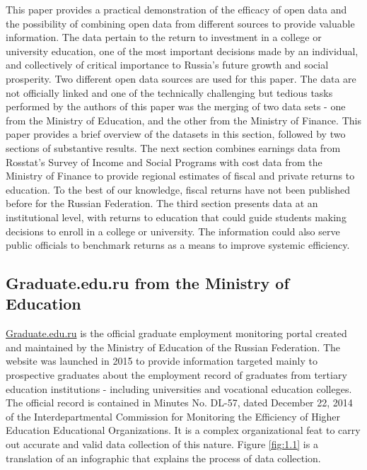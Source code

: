 \documentclass[alpha-refs]{wiley-article-05g}
\begin{document}
This paper provides a practical demonstration of the efficacy of open data 
and the possibility of combining open data from different sources to 
provide valuable information. The data pertain to the return to investment 
in a college or university education, one of the most important decisions 
made by an individual, and collectively of critical importance to Russia's 
future growth and social prosperity. Two different open data sources are 
used for this paper. The data are not officially linked and one of the 
technically challenging but tedious tasks performed by the authors of this 
paper was the merging of two data sets - one from the Ministry of 
Education, and the other from the Ministry of Finance. This paper provides 
a brief overview of the datasets in this section, followed by two sections 
of substantive results. The next section combines earnings data from 
Rosstat's Survey of Income and Social Programs with cost data from the 
Ministry of Finance to provide regional estimates of fiscal and private 
returns to education. To the best of our knowledge, fiscal returns have not 
been published before for the Russian Federation. The third section 
presents data at an institutional level, with returns to education that 
could guide students making decisions to enroll in a college or university. 
The information could also serve public officials to benchmark returns as a 
means to improve systemic efficiency. 

\subsection{Graduate.edu.ru from the Ministry of Education}

\url{Graduate.edu.ru} is the official graduate employment monitoring portal 
created and maintained by the Ministry of Education of the Russian 
Federation. The website was launched in 2015 to provide information 
targeted mainly to prospective graduates about the employment record of 
graduates from tertiary education institutions - including universities and 
vocational education colleges. The official record is contained in Minutes 
No. DL-57, dated December 22, 2014 of the Interdepartmental Commission for 
Monitoring the Efficiency of Higher Education Educational Organizations. It 
is a complex organizational feat to carry out accurate and valid data 
collection of this nature. Figure \ref{fig:1.1} is a translation of an 
infographic that explains the process of data collection. 

\vspace{0.5em}
\end{document}
